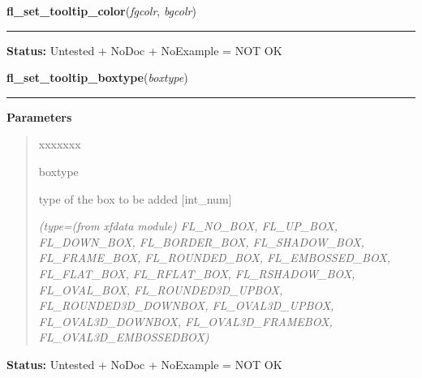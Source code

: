     \label{xformslib:library:fl_set_tooltip_color}

    \vspace{0.5ex}

\hspace{.8\funcindent}\begin{boxedminipage}{\funcwidth}

    \raggedright \textbf{fl\_set\_tooltip\_color}(\textit{fgcolr}, \textit{bgcolr})

    \vspace{-1.5ex}

    \rule{\textwidth}{0.5\fboxrule}
\setlength{\parskip}{2ex}
\setlength{\parskip}{1ex}
\textbf{Status:} Untested + NoDoc + NoExample = NOT OK



    \end{boxedminipage}

    \label{xformslib:library:fl_set_tooltip_boxtype}

    \vspace{0.5ex}

\hspace{.8\funcindent}\begin{boxedminipage}{\funcwidth}

    \raggedright \textbf{fl\_set\_tooltip\_boxtype}(\textit{boxtype})

    \vspace{-1.5ex}

    \rule{\textwidth}{0.5\fboxrule}
\setlength{\parskip}{2ex}
\setlength{\parskip}{1ex}
      \textbf{Parameters}
      \vspace{-1ex}

      \begin{quote}
        \begin{Ventry}{xxxxxxx}

          \item[boxtype]

          type of the box to be added [int\_num]

            {\it (type=(from xfdata module) FL\_NO\_BOX, FL\_UP\_BOX, FL\_DOWN\_BOX, 
FL\_BORDER\_BOX, FL\_SHADOW\_BOX, FL\_FRAME\_BOX, FL\_ROUNDED\_BOX, 
FL\_EMBOSSED\_BOX, FL\_FLAT\_BOX, FL\_RFLAT\_BOX, FL\_RSHADOW\_BOX, 
FL\_OVAL\_BOX, FL\_ROUNDED3D\_UPBOX, FL\_ROUNDED3D\_DOWNBOX, 
FL\_OVAL3D\_UPBOX, FL\_OVAL3D\_DOWNBOX, FL\_OVAL3D\_FRAMEBOX, 
FL\_OVAL3D\_EMBOSSEDBOX)}

        \end{Ventry}

      \end{quote}

\textbf{Status:} Untested + NoDoc + NoExample = NOT OK



    \end{boxedminipage}

